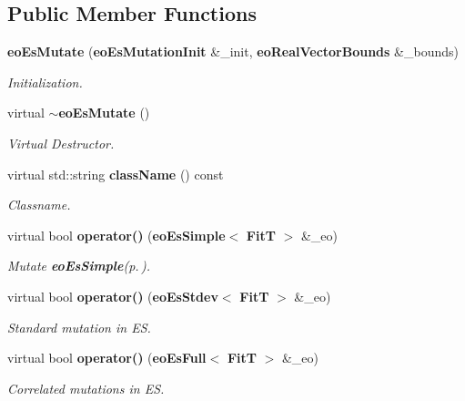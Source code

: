 \subsection*{Public Member Functions}
\begin{CompactItemize}
\item 
{\bf eo\-Es\-Mutate} ({\bf eo\-Es\-Mutation\-Init} \&\_\-init, {\bf eo\-Real\-Vector\-Bounds} \&\_\-bounds)
\begin{CompactList}\small\item\em Initialization. \item\end{CompactList}\item 
virtual {\bf $\sim$eo\-Es\-Mutate} ()\label{classeo_es_mutate_a1}

\begin{CompactList}\small\item\em Virtual Destructor. \item\end{CompactList}\item 
virtual std::string {\bf class\-Name} () const 
\begin{CompactList}\small\item\em Classname. \item\end{CompactList}\item 
virtual bool {\bf operator()} ({\bf eo\-Es\-Simple}$<$ {\bf Fit\-T} $>$ \&\_\-eo)
\begin{CompactList}\small\item\em Mutate {\bf eo\-Es\-Simple}{\rm (p.\,\pageref{classeo_es_simple})}. \item\end{CompactList}\item 
virtual bool {\bf operator()} ({\bf eo\-Es\-Stdev}$<$ {\bf Fit\-T} $>$ \&\_\-eo)
\begin{CompactList}\small\item\em Standard mutation in ES. \item\end{CompactList}\item 
virtual bool {\bf operator()} ({\bf eo\-Es\-Full}$<$ {\bf Fit\-T} $>$ \&\_\-eo)
\begin{CompactList}\small\item\em Correlated mutations in ES. \item\end{CompactList}\end{CompactItemize}
